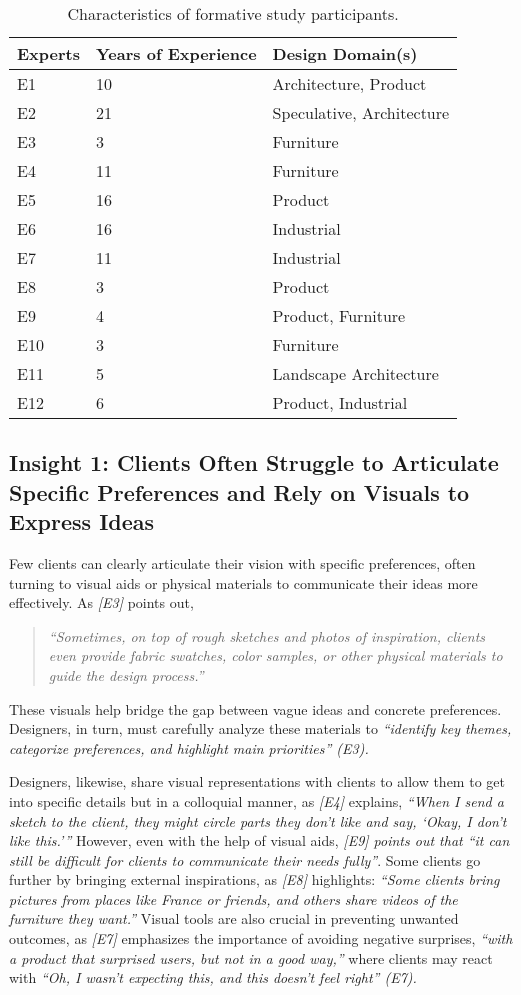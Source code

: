 \begin{table}[htbp]
\centering
\begin{tabular}{lll}
\toprule
\textbf{Experts} & \textbf{Years of Experience} & \textbf{Design Domain(s)} \\
\midrule
E1 & 10 & Architecture, Product \\
E2 & 21 & Speculative, Architecture \\
E3 & 3 & Furniture \\
E4 & 11 & Furniture \\
E5 & 16 & Product \\
E6 & 16 & Industrial \\
E7 & 11 & Industrial \\
E8 & 3 & Product \\
E9 & 4 & Product, Furniture \\
E10 & 3 & Furniture \\
E11 & 5 & Landscape Architecture \\
E12 & 6 & Product, Industrial \\
\bottomrule
\end{tabular}
\caption{Characteristics of formative study participants.}
\label{tab:formative_participants}
\end{table}

\subsection{Insight 1: Clients Often Struggle to Articulate Specific Preferences and Rely on Visuals to Express Ideas} 
Few clients can clearly articulate their vision with specific preferences, often turning to visual aids or physical materials to communicate their ideas more effectively. As \textit{[E3]} points out, \begin{quote}\textit{“Sometimes, on top of rough sketches and photos of inspiration, clients even provide fabric swatches, color samples, or other physical materials to guide the design process.”}\end{quote} These visuals help bridge the gap between vague ideas and concrete preferences. Designers, in turn, must carefully analyze these materials to \textit{“identify key themes, categorize preferences, and highlight main priorities” (E3).} 

Designers, likewise, share visual representations with clients to allow them to get into specific details but in a colloquial manner, as \textit{[E4]} explains, \textit{“When I send a sketch to the client, they might circle parts they don’t like and say, ‘Okay, I don’t like this.’”} However, even with the help of visual aids, \textit{[E9] points out that “it can still be difficult for clients to communicate their needs fully”}. Some clients go further by bringing external inspirations, as \textit{[E8] }highlights: \textit{“Some clients bring pictures from places like France or friends, and others share videos of the furniture they want.”} Visual tools are also crucial in preventing unwanted outcomes, as \textit{[E7]} emphasizes the importance of avoiding negative surprises, \textit{“with a product that surprised users, but not in a good way,”} where clients may react with \textit{“Oh, I wasn't expecting this, and this doesn’t feel right” (E7).}

